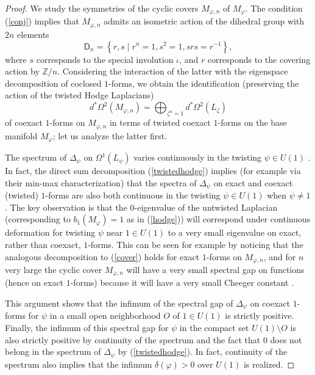 \documentclass[11pt]{amsart}
\theoremstyle{definition}
\theoremstyle{remark}
\begin{document}
\begin{proof} We study the symmetries of the cyclic covers $M_{\varphi,n}$ of $M_\varphi$. The condition (\ref{conj}) implies that $M_{\varphi,n}$ admits an isometric action of the dihedral group with $2n$ elements
\begin{equation*}
\mathsf{D}_n=\left\{r,s\mid r^n=1, s^2=1, srs=r^{-1}\right\},
\end{equation*}
where $s$ corresponds to the special involution $\iota$, and $r$ corresponds to the covering action by $\mathbb{Z}/n$. Considering the interaction of the latter with the eigenspace decomposition of coclosed $1$-forms, we obtain the identification (preserving the action of the twisted Hodge Laplacians)
\begin{equation}\label{cover}
d^*\Omega^2(M_{\varphi,n})=\bigoplus_{\zeta^n=1}d^*\Omega^2(L_\zeta)
\end{equation}
of coexact $1$-forms on $M_{\varphi,n}$ in terms of twisted coexact $1$-forms on the base manifold $M_\varphi$; let us analyze the latter first.
\par
The spectrum of $\Delta_\psi$ on $\Omega^1(L_\psi)$ varies continuously in the twisting $\psi\in U(1)$ \cite{Kat}. In fact, the direct sum decomposition (\ref{twistedhodge}) implies (for example via their min-max characterization) that the spectra of $\Delta_\psi$ on exact and coexact (twisted) $1$-forms are also both continuous in the twisting $\psi\in U(1)$ when $\psi\neq 1$. The key observation is that the $0$-eigenvalue of the untwisted Laplacian (corresponding to $b_1(M_\varphi) = 1$ as in (\ref{hodge})) will correspond under continuous deformation for twisting $\psi$ near $1\in U(1)$ to a very small eigenvalue on exact, rather than coexact, $1$-forms. This can be seen for example by noticing that the analogous decomposition to (\ref{cover}) holds for exact $1$-forms on $M_{\varphi,n}$, and for $n$ very large the cyclic cover $M_{\varphi,n}$ will have a very small spectral gap on functions (hence on exact $1$-forms) because it will have a very small Cheeger constant \cite{Cha}.
\par
This argument shows that the infimum of the spectral gap of $\Delta_{\psi}$ on coexact $1$-forms for $\psi$ in a small open neighborhood $O$ of $1\in U(1)$ is strictly positive. Finally, the infimum of this spectral gap for $\psi$ in the compact set $U(1)\setminus O$ is also strictly positive by continuity of the spectrum and the fact that $0$ does not belong in the spectrum of $\Delta_\psi$ by (\ref{twistedhodge}). In fact, continuity of the spectrum also implies that the infimum $\delta(\varphi)>0$ over $U(1)$ is realized.

\end{proof}
\end{document}
